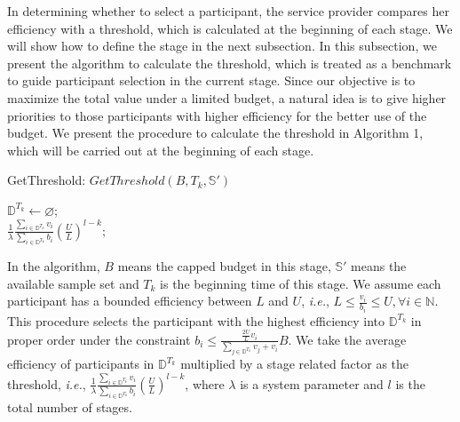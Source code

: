 \documentclass[conference,compsocconf,letterpaper,10pt]{IEEEtran}
\newcommand{\ie}{{\em i.e.}}
\begin{document}
In determining whether to select a participant, the service provider compares her efficiency with a threshold, which is calculated at the beginning of each stage. We will show how to define the stage in the next subsection. In this subsection, we present the algorithm to calculate the threshold, which is treated as a benchmark to guide participant selection in the current stage. Since our objective is to maximize the total value under a limited budget, a natural idea is to give higher priorities to those participants with higher efficiency for the better use of the budget. We present the procedure to calculate the threshold in Algorithm 1, which will be carried out at the beginning of each stage.

\begin{algorithm}
\BlankLine
{}
\caption{GetThreshold: $GetThreshold(B, {T_k}, \mathbb{S}')$}
\label{alg:GetThreshold}
\begin{small}
\BlankLine
$\mathbb{D}^{T_k}\leftarrow\varnothing$;\\
\Return $\frac{1}{\lambda}\frac{\sum_{i\in\mathbb{D}^{T_k}}v_i}{\sum_{i\in\mathbb{D}^{T_k}}b_i}\left(\frac{U}{L}\right)^{l-k};$
\end{small}
\end{algorithm}

In the algorithm, $B$ means the capped budget in this stage, $\mathbb{S}'$ means the available sample set and $T_k$ is the beginning time of this stage. We assume each participant has a bounded efficiency between $L$ and $U$, \ie, $L \le \frac{v_i}{b_i} \le U, \forall i \in \mathbb{N}$. This procedure selects the participant with the highest efficiency into $\mathbb{D}^{T_k}$ in proper order under the constraint $b_i \le \frac{\frac{2U}{L}v_i}{\sum\limits_{j \in\mathbb{D}^{T_k}}v_j+v_i}B$. We take the average efficiency of participants in $\mathbb{D}^{T_k}$ multiplied by a stage related factor as the threshold, \ie, $\frac{1}{\lambda}\frac{\sum_{i\in\mathbb{D}^{T_k}}v_i}{\sum_{i\in\mathbb{D}^{T_k}}b_i}\left(\frac{U}{L}\right)^{l-k}$, where $\lambda$ is a system parameter and $l$ is the total number of stages.
\end{document}
